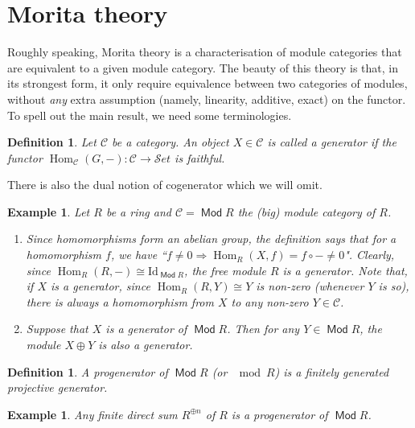 \documentclass[11pt,a4paper]{article}
\numberwithin{equation}{section}
\theoremstyle{all}
\newtheorem{example}[theorem]{Example}
\newtheorem{definition}[theorem]{Definition}
\theoremstyle{remark}
\newcommand{\CC}{\mathcal{C}}
\newcommand{\Hom}{\operatorname{Hom}\nolimits}
\DeclareMathOperator{\Mod}{\mathsf{Mod}}
\newcommand{\defn}[1]{\textsl{\color{darkblue} #1}}
\begin{document}
\pagebreak


\section{Morita theory}

Roughly speaking, Morita theory is a characterisation of module categories that are equivalent to a given module category.  The beauty of this theory is that, in its strongest form, it only require equivalence between two categories of modules, without \emph{any} extra assumption (namely, linearity, additive, exact) on the functor.
To spell out the main result, we need some terminologies.

\begin{definition}
Let $\CC$ be a category.  An object $X\in \CC$ is called a \defn{generator} if the functor $\Hom_\CC(G,-):\CC\to \mathcal{S}et$ is faithful.
\end{definition}
There is also the dual notion of cogenerator which we will omit.

\begin{example}
Let $R$ be a ring and $\CC=\Mod R$ the (big) module category of $R$.
\begin{enumerate}
\item Since homomorphisms form an abelian group, the definition says that for a homomorphism $f$, we have ``$f\neq 0\Rightarrow \Hom_R(X,f) = f\circ  - \neq 0$".  Clearly, since $\Hom_R(R,-)\cong \mathrm{Id}_{\Mod R}$, the free module $R$ is a generator.
Note that, if $X$ is a generator, since $\Hom_R(R,Y)\cong Y$ is non-zero (whenever $Y$ is so), there is always a homomorphism from $X$ to any non-zero $Y\in \CC$.

\item Suppose that $X$ is a generator of $\Mod R$.  Then for any $Y\in \Mod R$, the module $X\oplus Y$ is also a generator.
\end{enumerate}
\end{example}

\begin{definition}
A \defn{progenerator} of $\Mod R$ (or $\mod R$) is a finitely generated projective generator.
\end{definition}
\begin{example}
Any finite direct sum $R^{\oplus n}$ of $R$ is a progenerator of $\Mod R$.
\end{example}
\end{document}
